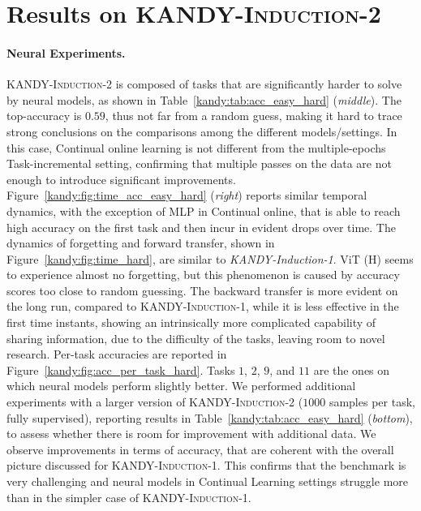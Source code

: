 \section{Results on \textsc{KANDY-Induction-2}}
\paragraph{Neural Experiments.}
\textsc{KANDY-Induction-2} is composed of tasks that are significantly harder to solve by neural models, as shown in Table~\ref{kandy:tab:acc_easy_hard} ({\it middle}). The top-accuracy is $0.59$, thus not far from a random guess, making it hard to trace strong conclusions on the comparisons among the different models/settings. 
In this case, {\sc\small Continual online} learning is not different from the multiple-epochs {\sc\small Task-incremental} setting, confirming that multiple passes on the data are not enough to introduce significant improvements. %
Figure~\ref{kandy:fig:time_acc_easy_hard} ({\it right}) reports similar temporal dynamics, with the exception of {\sc\small MLP} in {\sc\small Continual online}, that is able to reach high accuracy on the first task and then incur in evident drops over time. 
The dynamics of forgetting and forward transfer, shown in Figure~\ref{kandy:fig:time_hard}, are similar to \textit{KANDY-Induction-1}. {\sc\small ViT (H)} seems to experience almost no forgetting, but this phenomenon is caused by accuracy scores too close to random guessing. The backward transfer is more evident on the long run, compared to \textsc{KANDY-Induction-1}, while it is less effective in the first time instants, showing an intrinsically more complicated capability of sharing information, due to the difficulty of the tasks, leaving room to novel research. 
Per-task accuracies are reported in Figure~\ref{kandy:fig:acc_per_task_hard}. Tasks $1$, $2$, $9$, and $11$ are the ones on which neural models perform slightly better. 
%
We performed additional experiments with a larger version of \textsc{KANDY-Induction-2} ($1000$ samples per task, fully supervised), reporting results in Table~\ref{kandy:tab:acc_easy_hard} ({\it bottom}), to assess whether there is room for improvement with additional data. We observe improvements in terms of accuracy, that are coherent with the overall picture discussed for \textsc{KANDY-Induction-1}. This confirms that the benchmark is very challenging and neural models in Continual Learning settings struggle more than in the simpler case of \textsc{KANDY-Induction-1}. 

